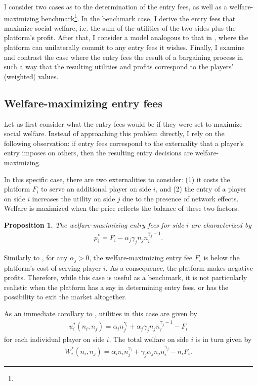 \documentclass[a4paper]{article}
\newtheorem{proposition}{Proposition}
\begin{document}
I consider two cases as to the determination of the entry fees, as well as a welfare-maximizing benchmark\footnote{}.
In the benchmark case, I derive the entry fees that maximize social welfare, i.e. the sum of the utilities of the two sides plus the platform's profit.
After that, I consider a model analogous to that in \textcite{armstrong2006competition}, where the platform can unilaterally commit to any entry fees it wishes.
Finally, I examine and contrast the case where the entry fees the result of a bargaining process in such a way that the resulting utilities and profits correspond to the players' (weighted) values.

\subsection{Welfare-maximizing entry fees}

Let us first consider what the entry fees would be if they were set to maximize social welfare.
Instead of approaching this problem directly, I rely on the following observation: if entry fees correspond to the externality that a player's entry imposes on others, then the resulting entry decisions are welfare-maximizing.

In this specific case, there are two externalities to consider: (1) it costs the platform $F_i$ to serve an additional player on side $i$, and (2) the entry of a player on side $i$ increases the utility on side $j$ due to the presence of network effects.
Welfare is maximized when the price reflects the balance of these two factors.
\begin{proposition}
    \label{prop:welfare_max_entry_fees}
    The welfare-maximizing entry fees for side $i$ are characterized by
    \begin{align}
        p_i^* = F_i - \alpha_j \gamma_j n_j n_i^{\gamma_j - 1}.  \label{eq:welfare_max_entry_fees}
    \end{align}
\end{proposition}

Similarly to \textcite{armstrong2006competition}, for any $\alpha_j > 0$, the welfare-maximizing entry fee $F_i$ is below the platform's cost of serving player $i$.
As a consequence, the platform makes negative profits.
Therefore, while this case is useful as a benchmark, it is not particularly realistic when the platform has a say in determining entry fees, or has the possibility to exit the market altogether.

As an immediate corollary to , utilities in this case are given by
\begin{align*}
    u_i^*(n_i, n_j) = \alpha_i n_j ^ {\gamma_i} + \alpha_j \gamma_j n_j n_i^{\gamma_j - 1} - F_i
\end{align*}
for each individual player on side $i$.
The total welfare on side $i$ is in turn given by
\begin{align}
    W_i^*(n_i, n_j) = \alpha_i n_i n_j ^ {\gamma_i} + \gamma_j \alpha_j n_j n_i^{\gamma_j} - n_i F_i.
\end{align}
\end{document}
